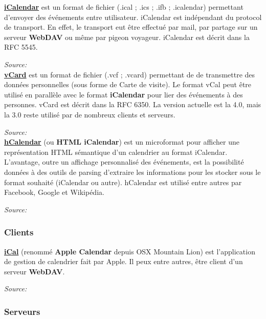 \underline{\textbf{iCalendar}} est un format de fichier (.ical ; .ics ; .ifb ; .icalendar) permettant d'envoyer des événements entre utilisateur. iCalendar est indépendant du protocol de transport. En effet, le transport eut être effectué par mail, par partage sur un serveur \textbf{WebDAV} ou même par pigeon voyageur. iCalendar est décrit dans la RFC 5545.

\textit{Source: }\\

\underline{\textbf{vCard}} est un format de fichier (.vcf ; .vcard) permettant de de transmettre des données personnelles (sous forme de Carte de visite). Le format vCal peut être utilisé en parallèle avec le format \textbf{iCalendar} pour lier des événements à des personnes. vCard est décrit dans la RFC 6350. La version actuelle est la 4.0, mais la 3.0 reste utilisé par de nombreux clients et serveurs.

\textit{Source: }\\

\underline{\textbf{hCalendar}} (ou \textbf{HTML iCalendar}) est un microformat pour afficher une représentation HTML sémantique d'un calendrier au format iCalendar. L'avantage, outre un affichage personnalisé des événements, est la possibilité données à des outils de parsing d'extraire les informations pour les stocker sous le format souhaité (iCalendar ou autre). hCalendar est utilisé entre autres par Facebook, Google et Wikipédia.

\textit{Source: }\\


\subsubsection*{Clients}

\underline{\textbf{iCal}} (renommé \textbf{Apple Calendar} depuis OSX Mountain Lion) est l'application de gestion de calendrier fait par Apple. Il peux entre autres, être client d'un serveur \textbf{WebDAV}.

\textit{Source: }\\


\subsubsection*{Serveurs}

